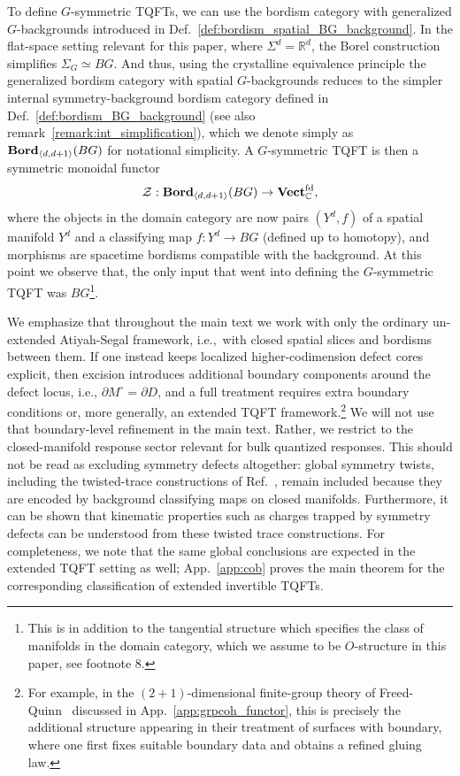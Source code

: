 \documentclass[aps,prx,reprint,superscriptaddress,twocolumn,amsmath,amssymb,amsfonts, nofootinbib]{revtex4-2}
\newcommand{\bordd}{{\bf Bord}_{\langle d, d+1\rangle}}
\theoremstyle{apsstyle}
\begin{document}
To define $G$-symmetric TQFTs, we can use the bordism category with generalized $G$-backgrounds introduced in Def.~\ref{def:bordism_spatial_BG_background}. In the flat-space setting relevant for this paper, where $\Sigma^{d}=\mathbb{R}^{d}$, the Borel construction simplifies $\Sigma_{G}\simeq BG$. And thus, using the crystalline equivalence principle the generalized bordism category with spatial $G$-backgrounds reduces to the simpler internal symmetry-background bordism category defined in Def.~\ref{def:bordism_BG_background} (see also remark~\ref{remark:int_simplification}), which we denote simply as $\bordd(BG)$ for notational simplicity. A $G$-symmetric TQFT is then a symmetric monoidal functor
\begin{equation*}
    \mathcal{Z}: \bordd(BG) \to \mathbf{Vect}^{\mathrm{fd}}_{\mathbb{C}}, 
\end{equation*}
\noindent where the objects in the domain category are now pairs $(Y^{d},f)$ of a spatial manifold $Y^{d}$ and a classifying map $f:Y^{d}\to BG$ (defined up to homotopy), and morphisms are spacetime bordisms compatible with the background. At this point we observe that, the only input that went into defining the $G$-symmetric TQFT was $BG$\footnote{This is in addition to the tangential structure which specifies the class of manifolds in the domain category, which we assume to be $O$-structure in this paper, see footnote 8.}. 

\bigskip 

We emphasize that throughout the main text we work with only the ordinary un-extended Atiyah-Segal framework, i.e.,\ with closed spatial slices and bordisms between them. If one instead keeps localized higher-codimension defect cores explicit, then excision introduces additional boundary components around the defect locus, i.e., $\partial M^{\circ} = \partial D$, and a full treatment requires extra boundary conditions or, more generally, an extended TQFT framework.\footnote{For example, in the $(2{+}1)$-dimensional finite-group theory of Freed-Quinn~\cite{FreedQuinn} discussed in App.~\ref{app:grpcoh_functor}, this is precisely the additional structure appearing in their treatment of surfaces with boundary, where one first fixes suitable boundary data and obtains a refined gluing law.} We will not use that boundary-level refinement in the main text. Rather, we restrict to the closed-manifold response sector relevant for bulk quantized responses. This should not be read as excluding symmetry defects altogether: global symmetry twists, including the twisted-trace constructions of Ref.~\cite{ThorngrenElse}, remain included because they are encoded by background classifying maps on closed manifolds. Furthermore, it can be shown that kinematic properties such as charges trapped by symmetry defects can be understood from these twisted trace constructions. For completeness, we note that the same global conclusions are expected in the extended TQFT setting as well; App.~\ref{app:cob} proves the main theorem for the corresponding classification of extended invertible TQFTs.
\end{document}
